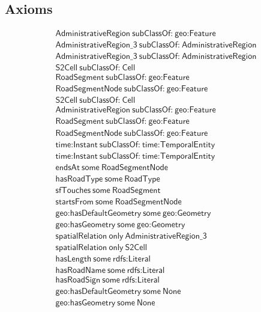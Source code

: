 \subsection{Axioms}
\begin{align}
  \textsf{AdministrativeRegion}~\textsf{subClassOf:}~\textsf{geo:Feature}\\
  \textsf{AdministrativeRegion\_3}~\textsf{subClassOf:}~\textsf{AdministrativeRegion}\\
  \textsf{AdministrativeRegion\_3}~\textsf{subClassOf:}~\textsf{AdministrativeRegion}\\
  \textsf{S2Cell}~\textsf{subClassOf:}~\textsf{Cell}\\
  \textsf{RoadSegment}~\textsf{subClassOf:}~\textsf{geo:Feature}\\
  \textsf{RoadSegmentNode}~\textsf{subClassOf:}~\textsf{geo:Feature}\\
  \textsf{S2Cell}~\textsf{subClassOf:}~\textsf{Cell}\\
  \textsf{AdministrativeRegion}~\textsf{subClassOf:}~\textsf{geo:Feature}\\
  \textsf{RoadSegment}~\textsf{subClassOf:}~\textsf{geo:Feature}\\
  \textsf{RoadSegmentNode}~\textsf{subClassOf:}~\textsf{geo:Feature}\\
  \textsf{time:Instant}~\textsf{subClassOf:}~\textsf{time:TemporalEntity}\\
  \textsf{time:Instant}~\textsf{subClassOf:}~\textsf{time:TemporalEntity}\\
  \textsf{endsAt}~\textsf{some}~\textsf{RoadSegmentNode}\\
  \textsf{hasRoadType}~\textsf{some}~\textsf{RoadType}\\
  \textsf{sfTouches}~\textsf{some}~\textsf{RoadSegment}\\
  \textsf{startsFrom}~\textsf{some}~\textsf{RoadSegmentNode}\\
  \textsf{geo:hasDefaultGeometry}~\textsf{some}~\textsf{geo:Geometry}\\
  \textsf{geo:hasGeometry}~\textsf{some}~\textsf{geo:Geometry}\\
  \textsf{spatialRelation}~\textsf{only}~\textsf{AdministrativeRegion\_3}\\
  \textsf{spatialRelation}~\textsf{only}~\textsf{S2Cell}\\
  \textsf{hasLength}~\textsf{some}~\textsf{rdfs:Literal}\\
  \textsf{hasRoadName}~\textsf{some}~\textsf{rdfs:Literal}\\
  \textsf{hasRoadSign}~\textsf{some}~\textsf{rdfs:Literal}\\
  \textsf{geo:hasDefaultGeometry}~\textsf{some}~\textsf{None}\\
  \textsf{geo:hasGeometry}~\textsf{some}~\textsf{None}\end{align}



